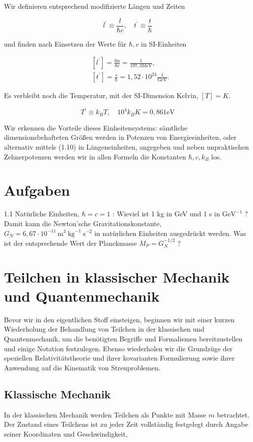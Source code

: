 \documentclass[10pt, letterpaper]{article}
\begin{document}
Wir definieren entsprechend modifizierte Längen und Zeiten

$$
l^{\prime} \equiv \frac{l}{\hbar c}, \quad t^{\prime} \equiv \frac{t}{\hbar}
$$

und finden nach Einsetzen der Werte für $\hbar, c$ in SI-Einheiten

$$
\begin{aligned}
& {\left[l^{\prime}\right]=\frac{\mathrm{fm}}{\hbar c}=\frac{1}{197,3 \mathrm{MeV}},} \\
& {\left[t^{\prime}\right]=\frac{s}{\hbar}=1,52 \cdot 10^{24} \frac{1}{\mathrm{GeV}} .}
\end{aligned}
$$

Es verbleibt noch die Temperatur, mit der SI-Dimension Kelvin, $[T]=K$.

$$
T^{\prime} \equiv k_{B} T, \quad 10^{4} k_{B} K=0,861 \mathrm{eV}
$$

Wir erkennen die Vorteile dieses Einheitensystems: sämtliche dimensionsbehafteten Größen werden in Potenzen von Energieeinheiten, oder alternativ mittels (1.10) in Längeneinheiten, angegeben und neben unpraktischen Zehnerpotenzen werden wir in allen Formeln die Konstanten $\hbar, c, k_{B}$ los.

\section{Aufgaben}
1.1 Natürliche Einheiten, $\hbar=c=1$ : Wieviel ist 1 kg in GeV und 1 s in $\mathrm{GeV}^{-1}$ ? Damit kann die Newton'sche Gravitationskonstante, $G_{N}=6,67 \cdot 10^{-11} \mathrm{~m}^{3} \mathrm{~kg}^{-1} \mathrm{~s}^{-2}$ in natürlichen Einheiten ausgedrückt werden. Was ist der entsprechende Wert der Planckmasse $M_{P}=G_{N}^{-1 / 2}$ ?

\section{Teilchen in klassischer Mechanik und Quantenmechanik}

Bevor wir in den eigentlichen Stoff einsteigen, beginnen wir mit einer kurzen Wiederholung der Behandlung von Teilchen in der klassischen und Quantenmechanik, um die benötigten Begriffe und Formalismen bereitzustellen und einige Notation festzulegen. Ebenso wiederholen wir die Grundzüge der speziellen Relativitätstheorie und ihrer kovarianten Formulierung sowie ihrer Anwendung auf die Kinematik von Streuproblemen.

\subsection{Klassische Mechanik}
In der klassischen Mechanik werden Teilchen als Punkte mit Masse $m$ betrachtet. Der Zustand eines Teilchens ist zu jeder Zeit vollständig festgelegt durch Angabe seiner Koordinaten und Geschwindigkeit,
\end{document}
